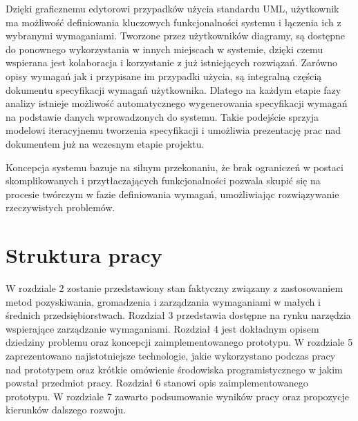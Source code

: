       Dzięki graficznemu edytorowi przypadków użycia standardu UML, użytkownik ma możliwość definiowania kluczowych funkcjonalności systemu i łączenia ich z wybranymi wymaganiami. Tworzone przez użytkowników diagramy, są dostępne do ponownego wykorzystania w innych miejscach w systemie, dzięki czemu wspierana jest kolaboracja i korzystanie z już istniejących rozwiązań. Zarówno opisy wymagań jak i przypisane im przypadki użycia, są integralną częścią dokumentu specyfikacji wymagań użytkownika. Dlatego na każdym etapie fazy analizy istnieje możliwość automatycznego wygenerowania specyfikacji wymagań na podstawie danych wprowadzonych do systemu. Takie podejście sprzyja modelowi iteracyjnemu tworzenia specyfikacji i umożliwia prezentację prac nad dokumentem już na wczesnym etapie projektu. 

      Koncepcja systemu bazuje na silnym przekonaniu, że brak ograniczeń w postaci skomplikowanych i przytłaczających funkcjonalności pozwala skupić się na procesie twórczym w fazie definiowania wymagań, umożliwiając rozwiązywanie rzeczywistych problemów. 

    \section{Struktura pracy}

      W rozdziale 2 zostanie przedstawiony stan faktyczny związany z zastosowaniem metod pozyskiwania, gromadzenia i zarządzania wymaganiami w małych i średnich przedsiębiorstwach. Rozdział 3 przedstawia dostępne na rynku narzędzia wspierające zarządzanie wymaganiami. Rozdział 4 jest dokładnym opisem dziedziny problemu oraz koncepcji zaimplementowanego prototypu. W rozdziale 5 zaprezentowano najistotniejsze technologie, jakie wykorzystano podczas pracy nad prototypem oraz krótkie omówienie środowiska programistycznego w jakim powstał przedmiot pracy. Rozdział 6 stanowi opis zaimplementowanego prototypu. W rozdziale 7 zawarto podsumowanie wyników pracy oraz propozycje kierunków dalszego rozwoju. 
